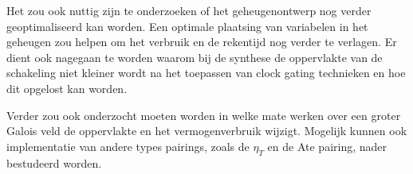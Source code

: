 Het zou ook nuttig zijn te onderzoeken of het geheugenontwerp nog verder geoptimaliseerd kan worden. Een optimale plaatsing van variabelen in het geheugen zou helpen om het verbruik en de rekentijd nog verder te verlagen. Er dient ook nagegaan te worden waarom bij de synthese de oppervlakte van de schakeling niet kleiner wordt na het toepassen van clock gating technieken en hoe dit opgelost kan worden.

Verder zou ook onderzocht moeten worden in welke mate werken over een groter Galois veld de oppervlakte en het vermogenverbruik wijzigt. Mogelijk kunnen ook implementatie van andere types pairings, zoals de $\eta_T$ en de Ate pairing, nader bestudeerd worden.

